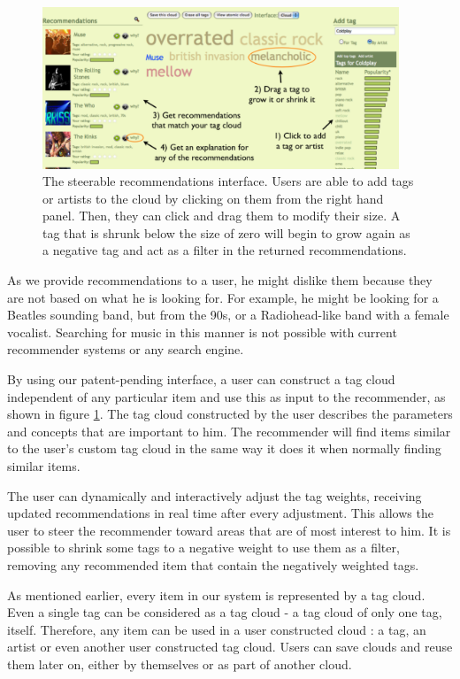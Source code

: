 \documentclass[a4paper,10pt,twocolumn]{article}
\begin{document}
\begin{figure}
\begin{center}
\includegraphics[width=0.95\textwidth]{steerable-withtxt}
\end{center}
\caption{The steerable recommendations interface. Users are able to add tags or artists to the cloud by clicking on them from the right hand panel. Then, they can click and drag them to modify their size. A tag that is shrunk below the size of zero will begin to grow again as a negative tag and act as a filter in the returned recommendations.}
\label{fig:steerable}
\end{figure}

As we provide recommendations to a user, he might dislike them because they are not
based on what he is looking for. For example, he might be looking for a Beatles sounding 
band, but from the 90s, or a Radiohead-like band with a female vocalist. Searching for 
music in this manner is not possible with current recommender systems or any search engine.

By using our patent-pending interface, a user can construct a tag cloud independent 
of any particular item and use this as input to the recommender, as shown in figure \ref{fig:steerable}.
The tag cloud constructed by the user describes the
parameters and concepts that are important to him. The recommender will find items similar to the user's custom
tag cloud in the same way it does it when normally finding similar items.

The user can dynamically and interactively adjust the tag
weights, receiving updated
recommendations in real time after every adjustment. This
allows the user to steer the recommender toward
areas that are of most interest to him. It is possible to shrink some tags to a negative weight to use them as a filter, removing 
any recommended item that contain the negatively weighted tags.

As mentioned earlier, every item in our system is represented by a tag cloud. Even a single tag can be considered as a tag cloud - a tag cloud of only one tag, itself. 
Therefore, any item can be used in a user constructed cloud : a tag, an artist or even another user constructed tag cloud. Users can 
save clouds and reuse them later on, either by themselves or as part of another cloud.
\end{document}

